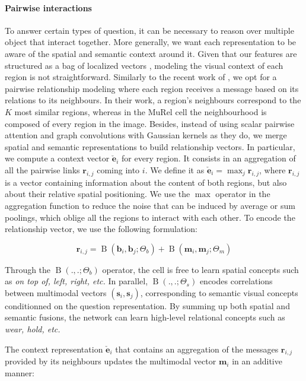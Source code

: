 \documentclass[10pt,twocolumn,letterpaper]{article}
\DeclareMathOperator*{\fusion}{B}
\begin{document}
\paragraph{Pairwise interactions}
To answer certain types of question, it can be necessary to reason over multiple object that interact together. More generally, we want each representation to be aware of the spatial and semantic context around it.
Given that our features are structured as a bag of localized vectors \cite{Anderson_2018_CVPR}, modeling the visual context of each region is not straightforward. Similarly to the recent work of \cite{learningconditionedgraph}, we opt for a pairwise relationship modeling where each region receives a message based on its relations to its neighbours. 
In their work, a region's neighbours correspond to the $K$ most similar regions, whereas in the MuRel cell the neighbourhood is composed of every region in the image.
Besides, instead of using scalar pairwise attention and graph convolutions with Gaussian kernels as they do, we merge spatial and semantic representations to build relationship vectors. 
In particular, we compute a context vector $\check{\bm{e}}_i$ for every region. It consists in an aggregation of all the pairwise links $\bm{r}_{i,j}$ coming into $i$. 
We define it as $\check{\bm{e}}_i = \max_j \bm{r}_{i,j}$, where $\bm{r}_{i,j}$ is a vector containing information about the content of both regions, but also about their relative spatial positioning.
We use the $\max$ operator in the aggregation function to reduce the noise that can be induced by average or sum poolings, which oblige all the regions to interact with each other.
To encode the relationship vector, we use the following formulation:

\begin{equation}
    \bm{r}_{i,j} = \fusion \left(\bm{b}_i, \bm{b}_j; \Theta_b \right) + \fusion \left( \bm{m}_i, \bm{m}_j; \Theta_m \right)
\end{equation}

Through the $\fusion(.,.;\Theta_b)$ operator, the cell is free to learn spatial concepts such as \textit{on top of, left, right, etc.} In parallel, $\fusion(.,.;\Theta_s)$ encodes correlations between multimodal vectors $(\bm{s}_i, \bm{s}_j)$, corresponding to semantic visual concepts conditionned on the question representation. By summing up both spatial and semantic fusions, the network can learn high-level relational concepts such as \textit{wear, hold, etc.}

The context representation $\check{\bm{e}}_i$ that contains an aggregation of the messages $\bm{r}_{i,j}$ provided by its neighbours updates the multimodal vector $\bm{m}_i$ in an additive manner:
\end{document}
